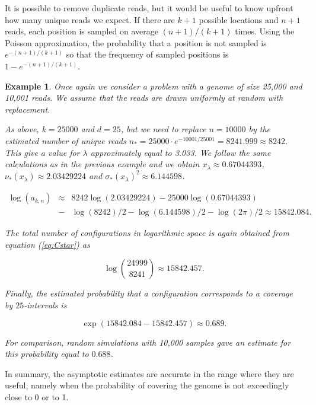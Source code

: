 \documentclass{article}
\newtheorem{example}{Example}
\begin{document}
It is possible to remove duplicate reads, but it would be useful to know
upfront how many unique reads we expect. If there are $k+1$ possible
locations and $n+1$ reads, each position is sampled on average
$(n+1)/(k+1)$ times. Using the Poisson approximation, the probability that
a position is not sampled is $e^{-(n+1)/(k+1)}$ so that the frequency of
sampled positions is $1-e^{-(n+1)/(k+1)}$.


\begin{example}

Once again we consider a problem with a genome of size 25,000 and 10,001
reads. We assume that the reads are drawn uniformly at random with
replacement.

As above, $k=25000$ and $d=25$, but we need to replace $n=10000$ by the
estimated number of unique reads $n_* = 25000 \cdot e^{-10001/25001} =
8241.999 \approx 8242$. This give a value for $\lambda$ approximately
equal to 3.033. We follow the same calculations as in the previous example
and we obtain $x_\lambda \approx 0.67044393$, $\nu_*(x_\lambda) \approx
2.03429224$ and $\sigma_*(x_\lambda)^2 \approx 6.144598$.

\begin{eqnarray*}
\log(a_{k,n}) &\approx& 8242\log(2.03429224) - 25000\log(0.67044393) \\
&-& \log(8242)/2 - \log(6.144598)/2 - \log(2\pi)/2
\approx 15842.084.
\end{eqnarray*}

The total number of configurations in logarithmic space is again
obtained from equation (\ref{eq:Cstar}) as

\begin{equation*}
\log { 24999 \choose 8241 } \approx 15842.457.
\end{equation*}

Finally, the estimated probability that a configuration corresponds to a
coverage by $25$-intervals is

\begin{equation*}
\exp(15842.084-15842.457) \approx 0.689.
\end{equation*}

For comparison, random simulations with 10,000 samples gave an estimate
for this probability equal to $0.688$.

\end{example}

In summary, the asymptotic estimates are accurate in the range where they
are useful, namely when the probability of covering the genome is not
exceedingly close to 0 or to 1.
\end{document}
